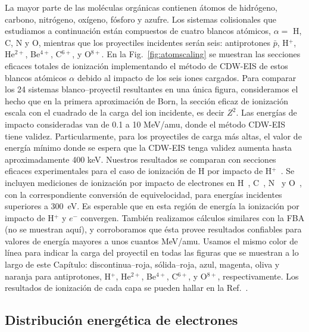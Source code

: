 La mayor parte de las moléculas orgánicas contienen átomos de hidrógeno, 
carbono, nitrógeno, oxígeno, fósforo y azufre. Los sistemas colisionales
que estudiamos a continuación están compuestos de cuatro blancos 
atómicos, $\alpha=$ H, C, N y O, mientras que los proyectiles incidentes 
serán seis: antiprotones $\bar{p}$, H$^{+}$, He$^{2+}$, Be$^{4+}$, 
C$^{6+}$, y O$^{8+}$. En la Fig.~\ref{fig:atomscaling} se muestran las 
secciones eficaces totales de ionización implementando el método de 
CDW-EIS de estos blancos atómicos $\alpha$ debido al impacto de los seis 
iones cargados. Para comparar los 24 sistemas blanco--proyectil 
resultantes en una única figura, consideramos el hecho que en la primera 
aproximación de Born, la sección eficaz de ionización escala con el 
cuadrado de la carga del ion incidente, es decir $Z^{2}$. 
Las energías de impacto consideradas van de 0.1 a 10 MeV/amu, donde el 
método CDW-EIS tiene validez. Particularmente, para los proyectiles de 
carga más altas, el valor de energía mínimo donde se espera que la 
CDW-EIS tenga validez aumenta hasta aproximadamente 400 keV. Nuestros 
resultados se comparan con secciones eficaces experimentales para el caso 
de ionización de H por impacto de H$^+$~\cite{Shah:81}. Se incluyen 
mediciones de ionización por impacto de electrones en H~\cite{Shah:87}, 
C~\cite{Brook:78}, N~\cite{Brook:78} y O~\cite{Thompson:95}, con la 
correspondiente conversión de equivelocidad, para energías incidentes 
superiores a 300~eV. Es esperable que en esta región de energía la 
ionización por impacto de H$^+$ y $e^-$ convergen. También realizamos 
cálculos similares con la FBA (no se muestran aquí), y corroboramos que 
ésta provee resultados confiables para valores de energía mayores a unos 
cuantos MeV/amu. Usamos el mismo color de línea para indicar la carga del 
proyectil en todas las figuras que se muestran a lo largo de este 
Capítulo: discontinua--roja, sólida--roja, azul, magenta, oliva y naranja 
para antiprotones, H$^{+}$, He$^{2+}$, Be$^{4+}$, C$^{6+}$, y O$^{8+}$, 
respectivamente. Los resultados de ionización de cada capa se pueden 
hallar en la Ref.~\cite{Miraglia:19}.

\subsection{Distribución energética de electrones}
\label{subsec:meanener}

